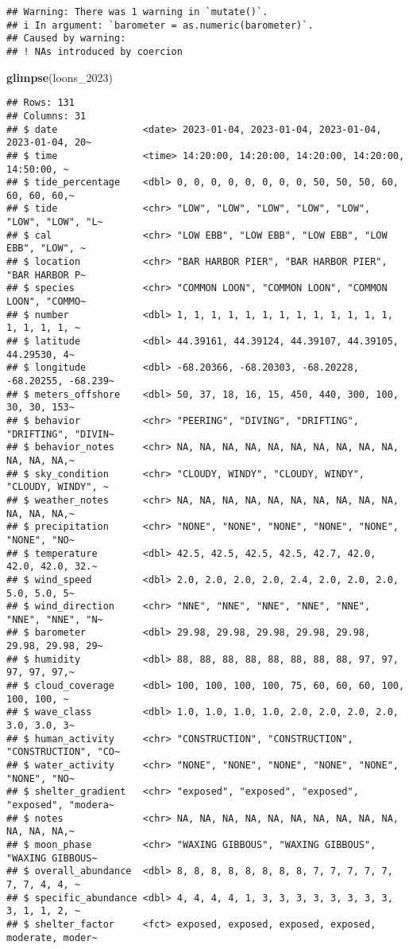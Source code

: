 \documentclass[
]{article}
\newenvironment{Shaded}{\begin{snugshade}}{\end{snugshade}}
\newcommand{\FunctionTok}[1]{\textcolor[rgb]{0.13,0.29,0.53}{\textbf{#1}}}
\newcommand{\NormalTok}[1]{#1}
\begin{document}
\begin{verbatim}
## Warning: There was 1 warning in `mutate()`.
## i In argument: `barometer = as.numeric(barometer)`.
## Caused by warning:
## ! NAs introduced by coercion
\end{verbatim}

\begin{Shaded}
\begin{Highlighting}[]
\FunctionTok{glimpse}\NormalTok{(loons\_2023)}
\end{Highlighting}
\end{Shaded}

\begin{verbatim}
## Rows: 131
## Columns: 31
## $ date               <date> 2023-01-04, 2023-01-04, 2023-01-04, 2023-01-04, 20~
## $ time               <time> 14:20:00, 14:20:00, 14:20:00, 14:20:00, 14:50:00, ~
## $ tide_percentage    <dbl> 0, 0, 0, 0, 0, 0, 0, 0, 50, 50, 50, 60, 60, 60, 60,~
## $ tide               <chr> "LOW", "LOW", "LOW", "LOW", "LOW", "LOW", "LOW", "L~
## $ cal                <chr> "LOW EBB", "LOW EBB", "LOW EBB", "LOW EBB", "LOW", ~
## $ location           <chr> "BAR HARBOR PIER", "BAR HARBOR PIER", "BAR HARBOR P~
## $ species            <chr> "COMMON LOON", "COMMON LOON", "COMMON LOON", "COMMO~
## $ number             <dbl> 1, 1, 1, 1, 1, 1, 1, 1, 1, 1, 1, 1, 1, 1, 1, 1, 1, ~
## $ latitude           <dbl> 44.39161, 44.39124, 44.39107, 44.39105, 44.29530, 4~
## $ longitude          <dbl> -68.20366, -68.20303, -68.20228, -68.20255, -68.239~
## $ meters_offshore    <dbl> 50, 37, 18, 16, 15, 450, 440, 300, 100, 30, 30, 153~
## $ behavior           <chr> "PEERING", "DIVING", "DRIFTING", "DRIFTING", "DIVIN~
## $ behavior_notes     <chr> NA, NA, NA, NA, NA, NA, NA, NA, NA, NA, NA, NA, NA,~
## $ sky_condition      <chr> "CLOUDY, WINDY", "CLOUDY, WINDY", "CLOUDY, WINDY", ~
## $ weather_notes      <chr> NA, NA, NA, NA, NA, NA, NA, NA, NA, NA, NA, NA, NA,~
## $ precipitation      <chr> "NONE", "NONE", "NONE", "NONE", "NONE", "NONE", "NO~
## $ temperature        <dbl> 42.5, 42.5, 42.5, 42.5, 42.7, 42.0, 42.0, 42.0, 32.~
## $ wind_speed         <dbl> 2.0, 2.0, 2.0, 2.0, 2.4, 2.0, 2.0, 2.0, 5.0, 5.0, 5~
## $ wind_direction     <chr> "NNE", "NNE", "NNE", "NNE", "NNE", "NNE", "NNE", "N~
## $ barometer          <dbl> 29.98, 29.98, 29.98, 29.98, 29.98, 29.98, 29.98, 29~
## $ humidity           <dbl> 88, 88, 88, 88, 88, 88, 88, 88, 97, 97, 97, 97, 97,~
## $ cloud_coverage     <dbl> 100, 100, 100, 100, 75, 60, 60, 60, 100, 100, 100, ~
## $ wave_class         <dbl> 1.0, 1.0, 1.0, 1.0, 2.0, 2.0, 2.0, 2.0, 3.0, 3.0, 3~
## $ human_activity     <chr> "CONSTRUCTION", "CONSTRUCTION", "CONSTRUCTION", "CO~
## $ water_activity     <chr> "NONE", "NONE", "NONE", "NONE", "NONE", "NONE", "NO~
## $ shelter_gradient   <chr> "exposed", "exposed", "exposed", "exposed", "modera~
## $ notes              <chr> NA, NA, NA, NA, NA, NA, NA, NA, NA, NA, NA, NA, NA,~
## $ moon_phase         <chr> "WAXING GIBBOUS", "WAXING GIBBOUS", "WAXING GIBBOUS~
## $ overall_abundance  <dbl> 8, 8, 8, 8, 8, 8, 8, 8, 7, 7, 7, 7, 7, 7, 7, 4, 4, ~
## $ specific_abundance <dbl> 4, 4, 4, 4, 1, 3, 3, 3, 3, 3, 3, 3, 3, 3, 1, 1, 2, ~
## $ shelter_factor     <fct> exposed, exposed, exposed, exposed, moderate, moder~
\end{verbatim}
\end{document}
